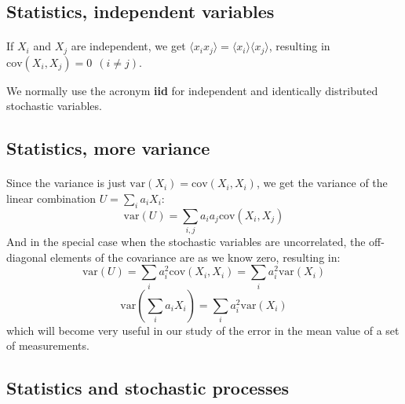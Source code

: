 \documentclass[%
oneside,                 %
final,                   %
10pt]{article}
\begin{document}
\subsection*{Statistics, independent variables}

\paragraph{}
If $X_i$ and $X_j$ are independent, we get 
$\langle x_i x_j\rangle =\langle x_i\rangle\langle x_j\rangle$, resulting in $\mathrm{cov}(X_i, X_j) = 0\ \ (i\neq j)$.

We normally use the acronym \textbf{iid} for independent and identically distributed stochastic variables.



\subsection*{Statistics, more variance}

\paragraph{}
Since the variance is just $\mathrm{var}(X_i) = \mathrm{cov}(X_i, X_i)$, we get
the variance of the linear combination $U = \sum_i a_i X_i$:
\begin{equation}
\mathrm{var}(U) = \sum_{i,j}a_i a_j \mathrm{cov}(X_i, X_j)
\label{eq:variance_linear_combination}
\end{equation}
And in the special case when the stochastic variables are
uncorrelated, the off-diagonal elements of the covariance are as we
know zero, resulting in:
\[
\mathrm{var}(U) = \sum_i a_i^2 \mathrm{cov}(X_i, X_i) = \sum_i a_i^2 \mathrm{var}(X_i)
\]
\[
\mathrm{var}(\sum_i a_i X_i) = \sum_i a_i^2 \mathrm{var}(X_i)
\]
which will become very useful in our study of the error in the mean
value of a set of measurements.



\subsection*{Statistics and stochastic processes}

\end{document}
